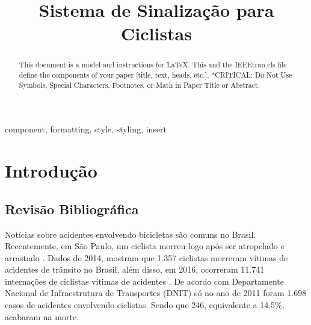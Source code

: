 \documentclass[conference]{IEEEtran}
\begin{document}
\title{Sistema de Sinalização para Ciclistas\\
}

\author{
  \and
}

\maketitle

\begin{abstract}
  This document is a model and instructions for \LaTeX.
  This and the IEEEtran.cls file define the components of your paper [title, text, heads, etc.]. *CRITICAL: Do Not Use Symbols, Special Characters, Footnotes,
  or Math in Paper Title or Abstract.
\end{abstract}

\begin{IEEEkeywords}
  component, formatting, style, styling, insert
\end{IEEEkeywords}

\section{Introdução}

\subsection{Revisão Bibliográfica}
Notícias sobre acidentes envolvendo bicicletas são comuns no Brasil. Recentemente, em São Paulo, um ciclista morreu logo após ser atropelado e arrastado \cite{b1}. Dados de 2014, mostram que 1.357 ciclistas morreram vítimas de acidentes de trânsito no Brasil, além disso, em 2016, ocorreram 11.741 internações de ciclistas vítimas de acidentes \cite{b2}. De acordo com Departamente Nacional de Infraestrutura de Transportes (DNIT) \cite{b3} só no ano de 2011 foram 1.698 casos de acidentes envolvendo ciclistas. Sendo que 246, equivalente a 14.5\%, acabaram na morte.
\end{document}
